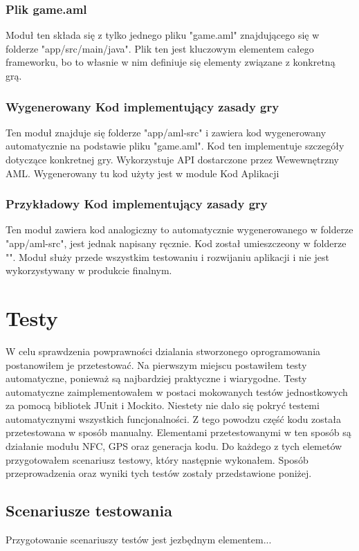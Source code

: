 \documentclass	{xmgr}
\begin{document}
\subsection{Plik game.aml}
Moduł ten składa się z tylko jednego pliku "game.aml" znajdującego się w folderze "app/src/main/java". Plik ten jest kluczowym elementem całego frameworku, bo to własnie w nim definiuje się elementy związane z konkretną grą.

\subsection{Wygenerowany Kod implementujący zasady gry}
Ten moduł znajduje się folderze "app/aml-src" i zawiera kod wygenerowany automatycznie na podstawie pliku "game.aml". Kod ten implementuje szczegóły dotyczące konkretnej gry. Wykorzystuje API dostarczone przez Wewewnętrzny AML. Wygenerowany tu kod użyty jest w module Kod Aplikacji

\subsection{Przykładowy Kod implementujący zasady gry}
Ten moduł zawiera kod analogiczny to automatycznie wygenerowanego w folderze "app/aml-src", jest jednak napisany ręcznie. Kod został umieszczeony w folderze "". Moduł służy przede wszystkim testowaniu i rozwijaniu aplikacji i nie jest wykorzystywany w produkcie finalnym.

\chapter{Testy} 
W celu sprawdzenia powprawności dzialania stworzonego oprogramowania postanowiłem je przetestować. Na pierwszym miejscu postawiłem testy automatyczne, ponieważ są najbardziej praktyczne i wiarygodne. Testy automatyczne zaimplementowałem w postaci mokowanych testów jednostkowych za pomocą bibliotek JUnit i Mockito.
Niestety nie dało się pokryć testemi automatycznymi wszystkich funcjonalności. Z tego powodzu część kodu została przetestowana w sposób manualny. Elementami przetestowanymi w ten sposób są działanie modułu NFC, GPS oraz generacja kodu. Do każdego z tych elemetów przygotowałem scenariusz testowy, który następnie wykonałem. Sposób przeprowadzenia oraz wyniki tych testów zostały przedstawione poniżej.

\section{Scenariusze testowania}
Przygotowanie scenariuszy testów jest jezbędnym elementem...
\end{document}
